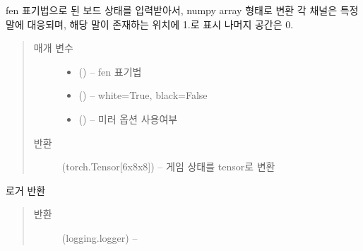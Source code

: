 \documentclass[letterpaper,10pt,english]{sphinxmanual}
\begin{document}
\begin{fulllineitems}
\label{\detokenize{agents.self_learning:agents.self_learning.utils.encode_observation}}
fen 표기법으로 된 보드 상태를 입력받아서, numpy array 형태로 변환
각 채널은 특정 말에 대응되며, 해당 말이 존재하는 위치에 1.로 표시
나머지 공간은 0.
\begin{quote}\begin{description}
\item[{매개 변수}] \leavevmode\begin{itemize}
\item {} 
 () -- fen 표기법

\item {} 
 () -- white=True, black=False

\item {} 
 () -- 미러 옵션 사용여부

\end{itemize}

\item[{반환}] \leavevmode
(torch.Tensor{[}6x8x8{]}) -- 게임 상태를 tensor로 변환

\end{description}\end{quote}

\end{fulllineitems}


\begin{fulllineitems}
\label{\detokenize{agents.self_learning:agents.self_learning.utils.get_logger}}
로거 반환
\begin{quote}\begin{description}
\item[{반환}] \leavevmode
(logging.logger) --

\end{description}\end{quote}

\end{fulllineitems}
\end{document}
